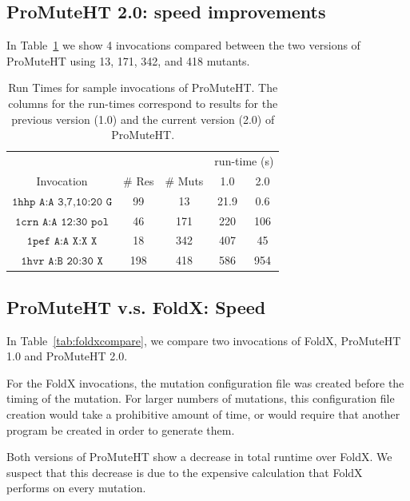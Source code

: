 \documentclass[sigconf]{acmart}
\begin{document}
\subsection{ProMuteHT 2.0: speed improvements}
In Table~\ref{tab:benchmarking} we show 4 invocations compared between the two versions of ProMuteHT using 13, 171, 342, and 418 mutants.

\begin{table}[h]
	\caption{Run Times for sample invocations of ProMuteHT.  The columns for the run-times correspond to results for the previous version (1.0) and the current version (2.0) of ProMuteHT.}
	\label{tab:benchmarking} 
	\centering
	\begin{tabular}{|c|c|c|c|c|} \hline
		\rowcolor{lightgray} &  &  & \multicolumn{2}{c|}{run-time (s)}\\
		\rowcolor{lightgray}Invocation & \# Res & \# Muts & 1.0 & 2.0\\ \hline
		$\texttt{1hhp A:A 3,7,10:20 G}$ & 99 & 13 & 21.9 & 0.6 \\ \hline
		$\texttt{1crn A:A 12:30 pol}$ & 46 & 171 & 220 & 106 \\ \hline
		$\texttt{1pef A:A X:X X}$ & 18 & 342 & 407 & 45 \\ \hline
		$\texttt{1hvr A:B 20:30 X}$ & 198 & 418 & 586 & 954\\ \hline
	\end{tabular}
\end{table}

\subsection{ProMuteHT v.s. FoldX: Speed}
In Table~\ref{tab:foldxcompare}, we compare two invocations of FoldX, ProMuteHT 1.0 and ProMuteHT 2.0.

For the FoldX invocations, the mutation configuration file was created before the timing of the mutation.  For larger numbers of mutations, this configuration file creation would take a prohibitive amount of time, or would require that another program be created in order to generate them.

Both versions of ProMuteHT show a decrease in total runtime over FoldX.  We suspect that this decrease is due to the expensive calculation that FoldX performs on every mutation.
\end{document}
